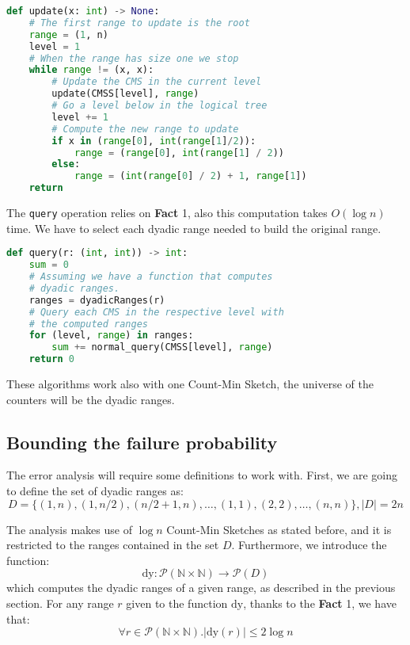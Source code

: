 \documentclass{article}
\begin{document}
\begin{lstlisting}[language=python]
def update(x: int) -> None:
    # The first range to update is the root
    range = (1, n)
    level = 1
    # When the range has size one we stop
    while range != (x, x):
        # Update the CMS in the current level
        update(CMSS[level], range) 
        # Go a level below in the logical tree
        level += 1 
        # Compute the new range to update
        if x in (range[0], int(range[1]/2)):
            range = (range[0], int(range[1] / 2))
        else:
            range = (int(range[0] / 2) + 1, range[1])
    return
\end{lstlisting}

\noindent The \verb+query+ operation relies on \textbf{Fact} 1, also this computation takes $O(\log n)$ time. 
We have to select each dyadic range needed to build the original range.

\begin{lstlisting}[language=python]
def query(r: (int, int)) -> int:
    sum = 0
    # Assuming we have a function that computes
    # dyadic ranges.
    ranges = dyadicRanges(r)
    # Query each CMS in the respective level with
    # the computed ranges
    for (level, range) in ranges:
        sum += normal_query(CMSS[level], range)
    return 0
\end{lstlisting}

\noindent These algorithms work also with one Count-Min Sketch, the universe of the counters will be the dyadic ranges.

\subsection{Bounding the failure probability}

The error analysis will require some definitions to work with. First, we are going to define the set of dyadic ranges as:
\begin{equation*}
    D = \{(1, n), (1, {n}/{2}), ({n}/{2} + 1, n), \dots, (1, 1), (2, 2), \dots, (n, n)\}, |D| = 2n
\end{equation*}

\noindent The analysis makes use of $\log n$ Count-Min Sketches as stated before, and it is restricted to the ranges contained in the set $D$. Furthermore, we
introduce the function:
\begin{equation*}
    \textrm{dy}: \mathcal{P}(\mathbb{N} \times \mathbb{N}) \to \mathcal{P}(D) 
\end{equation*}
which computes the dyadic ranges of a given range, as described in the previous section. For any range $r$ given to the function $\textrm{dy}$, thanks to the \textbf{Fact} 1, we have that:
\begin{equation*}
    \forall r \in \mathcal{P}(\mathbb{N} \times \mathbb{N}). |\textrm{dy}(r)| \le 2 \log n
\end{equation*}
\end{document}
